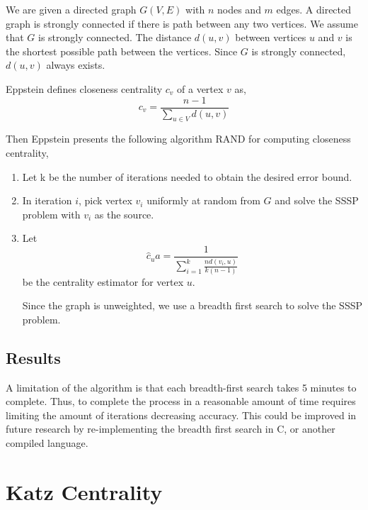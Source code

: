 \documentclass{article}
\begin{document}
We are given a directed graph $G(V,E)$ with $n$ nodes and $m$ edges.
A directed graph is strongly connected if there is path between any two vertices. We assume that $G$ is strongly connected.
The distance $d(u, v)$ between vertices $u$ and $v$ is the shortest possible path between the vertices. Since $G$ is strongly connected, $d(u, v)$ always exists.


Eppstein defines closeness centrality $c_v$ of a vertex $v$ as,
\begin{equation*}
    c_v = \frac{n-1}{\sum_{u \in V}d(u,v)}
\end{equation*} 

Then Eppstein presents the following algorithm RAND for computing closeness centrality,
\begin{enumerate}[1.]
    \item 
    Let k be the number of iterations needed to obtain the desired error bound.

    \item
    In iteration $i$, pick vertex $v_i$ uniformly at random from $G$ and solve the SSSP problem with $v_i$ as the source.

    \item 
    Let
    \begin{equation*}
        \hat{c}_ua = \frac{1}{\sum^k_{i=1} \frac{n d(v_i, u)}{k(n-1)}}
    \end{equation*}
    be the centrality estimator for vertex $u$.

    Since the graph is unweighted, we use a breadth first search to solve the SSSP problem.

    
\end{enumerate}

\subsection*{Results}

A limitation of the algorithm is that each breadth-first search takes 5 minutes to complete. Thus, to complete the process in a reasonable amount of time requires limiting the amount of iterations decreasing accuracy. This could be improved in future research by re-implementing the breadth first search in C, or another compiled language.





\section{Katz Centrality}
\end{document}
